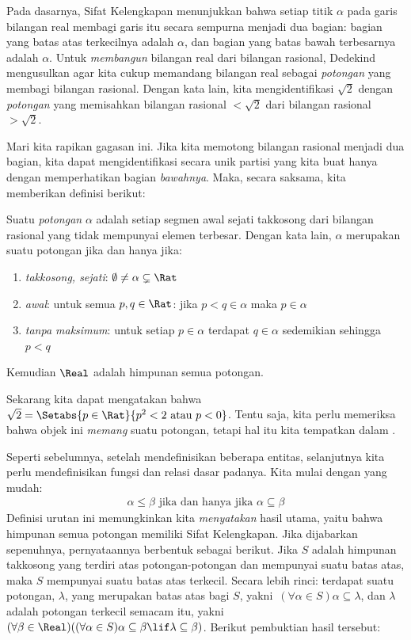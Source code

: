 \documentclass[../../../include/open-logic-section]{subfiles}
\begin{document}

Pada dasarnya, Sifat Kelengkapan menunjukkan bahwa setiap titik $\alpha$ pada
garis bilangan real membagi garis itu secara sempurna menjadi dua bagian:
bagian yang batas atas terkecilnya adalah $\alpha$, dan bagian yang batas bawah
terbesarnya adalah $\alpha$. Untuk \emph{membangun} bilangan real dari
bilangan rasional, Dedekind mengusulkan agar kita cukup memandang bilangan
real sebagai \emph{potongan} yang membagi bilangan rasional. Dengan kata lain,
kita mengidentifikasi $\sqrt{2}$ dengan \emph{potongan} yang memisahkan
bilangan rasional $< \sqrt{2}$ dari bilangan rasional $> \sqrt{2}$.

Mari kita rapikan gagasan ini. Jika kita memotong bilangan rasional menjadi
dua bagian, kita dapat mengidentifikasi secara unik partisi yang kita buat
hanya dengan memperhatikan bagian \emph{bawahnya}. Maka, secara saksama, kita
memberikan definisi berikut:

\begin{defn}[Potongan]
Suatu \emph{potongan} $\alpha$ adalah setiap segmen awal sejati takkosong dari
bilangan rasional yang tidak mempunyai elemen terbesar.
Dengan kata lain, $\alpha$ merupakan suatu potongan jika dan hanya jika:
\begin{enumerate}
	\item \emph{takkosong, sejati}: $\emptyset \neq \alpha \subsetneq \Rat$
	\item \emph{awal}: untuk semua $p,q \in \Rat$: jika $p < q \in \alpha$ maka $p \in \alpha$
	\item \emph{tanpa maksimum}: untuk setiap $p \in \alpha$ terdapat $q \in \alpha$ sedemikian sehingga $p < q$
\end{enumerate}
Kemudian $\Real$ adalah himpunan semua potongan.
\end{defn}

Sekarang kita dapat mengatakan bahwa $\sqrt{2} = \Setabs{p \in \Rat}{p^2 < 2\text{
atau }p < 0}$. Tentu saja, kita perlu memeriksa bahwa objek ini \emph{memang}
suatu potongan, tetapi hal itu kita tempatkan dalam .

Seperti sebelumnya, setelah mendefinisikan beberapa entitas, selanjutnya kita
perlu mendefinisikan fungsi dan relasi dasar padanya. Kita mulai dengan yang
mudah:
\begin{align*}
	\alpha \leq \beta \text{ jika dan hanya jika }\alpha \subseteq \beta
\end{align*}
Definisi urutan ini memungkinkan kita \emph{menyatakan} hasil utama, yaitu
bahwa himpunan semua potongan memiliki Sifat Kelengkapan. Jika dijabarkan
sepenuhnya, pernyataannya berbentuk sebagai berikut. Jika $S$ adalah himpunan
takkosong yang terdiri atas potongan-potongan dan mempunyai suatu batas atas, maka $S$ mempunyai
suatu batas atas terkecil. Secara lebih rinci: terdapat suatu potongan,
$\lambda$, yang merupakan batas atas bagi $S$, yakni\ $(\forall \alpha \in S)\alpha \subseteq
\lambda$, dan $\lambda$ adalah potongan terkecil semacam itu, yakni\ $(\forall \beta \in \Real)((\forall \alpha \in S)\alpha \subseteq \beta \lif \lambda \subseteq \beta)$. Berikut
pembuktian hasil tersebut:
\end{document}
